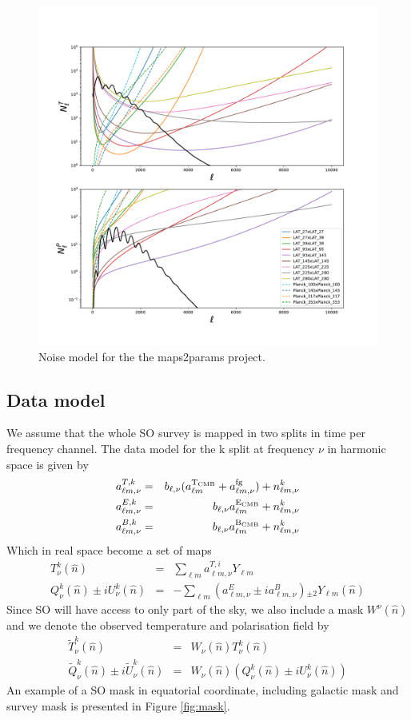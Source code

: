\documentclass[a4paper, 11pt]{article}
\def\ba{\begin{eqnarray}}
\def\ea{\end{eqnarray}}
\begin{document}
\begin{figure}
  \centering
  \includegraphics[width=1 \textwidth]{noise_ps_plot.pdf}
  \caption{Noise model for the the maps2params project.}
  \label{fig:noise_model}
\end{figure}

\subsection{Data model}

We assume that the whole SO survey is mapped in two splits in time per frequency channel.
The data model for the k split at frequency $\nu$ in harmonic space is given by
\ba
a^{T, k}_{\ell m, \nu} &=&  b_{\ell, \nu} (a^{\rm T_{CMB}}_{\ell m} + a^{\rm fg}_{\ell m, \nu}) + n^{k}_{\ell m, \nu}  \\
a^{E, k}_{\ell m, \nu} &=&  b_{\ell, \nu} a^{\rm E_{CMB}}_{\ell m}  + n^{k}_{\ell m, \nu} \\
a^{B, k}_{\ell m, \nu} &=&  b_{\ell, \nu} a^{\rm B_{CMB}}_{\ell m}  + n^{k}_{\ell m, \nu}
\ea
Which in real space become a set of maps
\ba
T^{k}_{\nu}(\hat{n}) &=&  \sum_{\ell m }  a^{T, i}_{\ell m, \nu} Y_{\ell m} \\
Q^{k}_{\nu}(\hat{n}) \pm i U^{k}_{\nu}(\hat{n})  &=&  - \sum_{\ell m} (a^{E}_{\ell m, \nu} \pm i a^{B}_{\ell m, \nu}) {}_{\pm 2} Y_{\ell m} (\hat{n})
\ea
Since SO will have access to only part of the sky, we also include a mask $W^{\nu}(\hat{n})$ and we denote the observed temperature and polarisation field by
\ba
\tilde{T}^{k}_{\nu}(\hat{n}) &=&  W_{\nu}(\hat{n}) T^{k}_{\nu}(\hat{n}) \\
\tilde{Q}^{k}_{\nu}(\hat{n}) \pm i \tilde{U}^{k}_{\nu}(\hat{n}) &=& W_{\nu}(\hat{n}) (Q^{k}_{\nu}(\hat{n}) \pm i U^{k}_{\nu}(\hat{n}))  
\ea
An example of a SO mask in equatorial coordinate, including galactic mask and survey mask is presented in Figure \ref{fig:mask}. 
 
\end{document}
